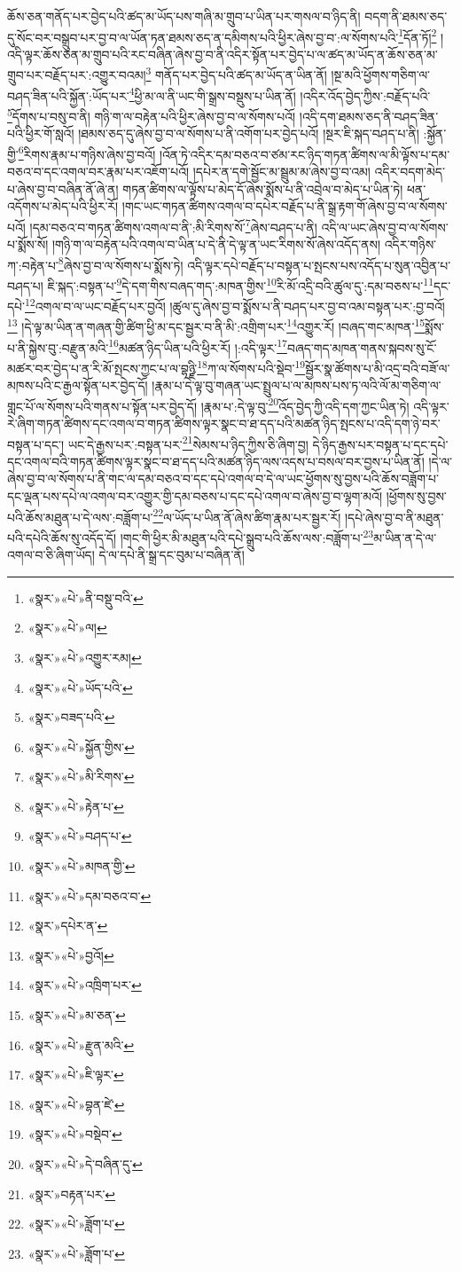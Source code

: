 ཆོས་ཅན་གནོད་པར་བྱེད་པའི་ཚད་མ་ཡོད་པས་གཞི་མ་གྲུབ་པ་ཡིན་པར་གསལ་བ་ཉིད་ནི། བདག་ནི་ཐམས་ཅད་དུ་སོང་བར་བསྒྲུབ་པར་བྱ་བ་ལ་ཡོན་ཏན་ཐམས་ཅད་ན་དམིགས་པའི་ཕྱིར་ཞེས་བྱ་བ་:ལ་སོགས་པའི་\footnote{«སྣར་»«པེ་»ནི་བསྡུ་བའི་}དོན་ཏོ།\footnote{«སྣར་»«པེ་»ལ།} །འདི་ལྟར་ཆོས་ཅན་མ་གྲུབ་པའི་རང་བཞིན་ཞེས་བྱ་བ་ནི་འདིར་སྟོན་པར་བྱེད་པ་ལ་ཚད་མ་ཡོད་ན་ཆོས་ཅན་མ་གྲུབ་པར་བརྗོད་པར་:འགྱུར་བའམ།\footnote{«སྣར་»«པེ་»འགྱུར་རམ།} གནོད་པར་བྱེད་པའི་ཚད་མ་ཡོད་ན་ཡིན་ནོ། །སྔ་མའི་ཕྱོགས་གཅིག་ལ་བཤད་ཟིན་པའི་སྐྱོན་:ཡོད་པར་\footnote{«སྣར་»«པེ་»ཡོད་པའི་}ཕྱི་མ་ལ་ནི་ཡང་གི་སྒྲས་བསྡུས་པ་ཡིན་ནོ། །འདིར་འོད་བྱེད་ཀྱིས་:བརྗོད་པའི་\footnote{«སྣར་»བཟད་པའི་}དོགས་པ་བསུ་བ་ནི། གཉི་ག་ལ་བརྟེན་པའི་ཕྱིར་ཞེས་བྱ་བ་ལ་སོགས་པའོ། །འདི་དག་ཐམས་ཅད་ནི་བཤད་ཟིན་པའི་ཕྱིར་གོ་སླའོ། །ཐམས་ཅད་དུ་ཞེས་བྱ་བ་ལ་སོགས་པ་ནི་འགོག་པར་བྱེད་པའོ། །སྔར་ཇི་སྐད་བཤད་པ་ནི། :སྐྱོན་གྱི་\footnote{«སྣར་»«པེ་»སྐྱོན་གྱིས་}རིགས་རྣམ་པ་གཉིས་ཞེས་བྱ་བའོ། །འོན་ཏེ་འདིར་དམ་བཅའ་བ་ཙམ་རང་ཉིད་གཏན་ཚིགས་ལ་མི་ལྟོས་པ་དམ་བཅའ་བ་དང་འགལ་བར་རྣམ་པར་འཇོག་པའོ། །དཔེར་ན་དགེ་སྦྱོང་མ་སྦྲུམ་མ་ཞེས་བྱ་བ་འམ། འདིར་བདག་མེད་པ་ཞེས་བྱ་བ་བཞིན་ནོ་ཞེ་ན། གཏན་ཚིགས་ལ་ལྟོས་པ་མེད་དོ་ཞེས་སྨོས་པ་ནི་འབྲེལ་བ་མེད་པ་ཡིན་ཏེ། ཕན་འདོགས་པ་མེད་པའི་ཕྱིར་རོ། །གང་ཡང་གཏན་ཚིགས་འགལ་བ་དཔེར་བརྗོད་པ་ནི་སྒྲ་རྟག་གོ་ཞེས་བྱ་བ་ལ་སོགས་པའོ། །དམ་བཅའ་བ་གཏན་ཚིགས་འགལ་བ་ནི་:མི་རིགས་སོ་\footnote{«སྣར་»«པེ་»མི་རིགས་}ཞེས་བཤད་པ་ནི། འདི་ལ་ཡང་ཞེས་བྱ་བ་ལ་སོགས་པ་སྨོས་སོ། །གཉི་ག་ལ་བརྟེན་པའི་འགལ་བ་ཡིན་པ་དེ་ནི་དེ་ལྟ་ན་ཡང་རིགས་སོ་ཞེས་འདོད་ནས། འདིར་གཉིས་ཀ་:བརྟེན་པ་\footnote{«སྣར་»«པེ་»རྟེན་པ་}ཞེས་བྱ་བ་ལ་སོགས་པ་སྨོས་ཏེ། འདི་ལྟར་དཔེ་བརྗོད་པ་བསྟན་པ་སྤངས་པས་འདོད་པ་སུན་འབྱིན་པ་བཤད་པ། ཇི་སྐད་:བསྟན་པ་\footnote{«སྣར་»«པེ་»བཤད་པ་}དེ་དག་གིས་བཞད་གད་:མཁན་གྱིས་\footnote{«སྣར་»«པེ་»མཁན་གྱི་}རི་མོ་འདྲི་བའི་ཚུལ་དུ་:དམ་བཅས་པ་\footnote{«སྣར་»«པེ་»དམ་བཅའ་བ་}དང་དཔེ་\footnote{«སྣར་»དཔེར་ན་}འགལ་བ་ལ་ཡང་བརྗོད་པར་བྱའོ། །ཚུལ་དུ་ཞེས་བྱ་བ་སྨོས་པ་ནི་བཤད་པར་བྱ་བ་འམ་བསྟན་པར་:བྱ་བའོ།\footnote{«སྣར་»«པེ་»བྱའོ།} །དེ་ལྟ་མ་ཡིན་ན་གཞན་གྱི་ཚིག་ཕྱི་མ་དང་སྦྱར་བ་ནི་མི་:འགྲིག་པར་\footnote{«སྣར་»«པེ་»འཁྲིག་པར་}འགྱུར་རོ། །བཞད་གང་མཁན་\footnote{«སྣར་»«པེ་»མ་ཅན་}སྨོས་པ་ནི་སྐྱེས་བུ་:བརྫུན་མའི་\footnote{«སྣར་»«པེ་»རྫུན་མའི་}མཚན་ཉིད་ཡིན་པའི་ཕྱིར་རོ། །:འདི་ལྟར་\footnote{«སྣར་»«པེ་»ཇི་ལྟར་}བཞད་གད་མཁན་གནས་སྐབས་སུ་ངོ་མཚར་བར་བྱེད་པ་ན་རི་མོ་སྤངས་ཀྱང་པ་ལ་བྷཉྫི་\footnote{«སྣར་»«པེ་»བྷན་ཛེ་}ཀ་ལ་སོགས་པའི་སྡེབ་\footnote{«སྣར་»«པེ་»བསྡེབ་}སྦྱོར་སྣ་ཚོགས་པ་མི་འདྲ་བའི་བཟོ་ལ་མཁས་པའི་ང་རྒྱལ་སྟོན་པར་བྱེད་དོ། །རྣམ་པ་དེ་ལྟ་བུ་གཞན་ཡང་སྤྲུལ་པ་ལ་མཁས་པས་ཏ་ལའི་ལོ་མ་གཅིག་ལ་གླང་པོ་ལ་སོགས་པའི་གནས་པ་སྟོན་པར་བྱེད་དོ། །རྣམ་པ་:དེ་ལྟ་བུ་\footnote{«སྣར་»«པེ་»དེ་བཞིན་དུ་}འོད་བྱེད་ཀྱི་འདི་དག་ཀྱང་ཡིན་ཏེ། འདི་ལྟར་རེ་ཞིག་གཏན་ཚིགས་དང་འགལ་བ་གཏན་ཚིགས་ལྟར་སྣང་བ་ཐ་དད་པའི་མཚན་ཉིད་སྤངས་པ་འདི་དག་ཉེ་བར་བསྟན་པ་དང་། ཡང་དེ་རྒྱས་པར་:བསྟན་པར་\footnote{«སྣར་»བརྟན་པར་}སེམས་པ་ཉིད་ཀྱིས་ཅི་ཞིག་བྱ། དེ་ཉིད་རྒྱས་པར་བསྟན་པ་དང་དཔེ་དང་འགལ་བའི་གཏན་ཚིགས་ལྟར་སྣང་བ་ཐ་དད་པའི་མཚན་ཉིད་ལས་འདས་པ་བསལ་བར་བྱས་པ་ཡིན་ནོ། །དེ་ལ་ཞེས་བྱ་བ་ལ་སོགས་པ་ནི་གང་ལ་དམ་བཅའ་བ་དང་དཔེ་འགལ་བ་དེ་ལ་ཡང་ཕྱོགས་སུ་བྱས་པའི་ཆོས་བཟློག་པ་དང་ལྡན་པས་དཔེ་ལ་འགལ་བར་འགྱུར་གྱི་དམ་བཅས་པ་དང་དཔེ་འགལ་བ་ཞེས་བྱ་བ་ལྷག་མའོ། །ཕྱོགས་སུ་བྱས་པའི་ཆོས་མཐུན་པ་དེ་ལས་:བཟློག་པ་\footnote{«སྣར་»«པེ་»ཟློག་པ་}ལ་ཡོད་པ་ཡིན་ནོ་ཞེས་ཚིག་རྣམ་པར་སྦྱར་རོ། །དཔེ་ཞེས་བྱ་བ་ནི་མཐུན་པའི་དཔེའི་ཆོས་སུ་འདོད་དོ། །གང་གི་ཕྱིར་མི་མཐུན་པའི་དཔེ་སྒྲུབ་པའི་ཆོས་ལས་:བཟློག་པ་\footnote{«སྣར་»«པེ་»ཟློག་པ་}མ་ཡིན་ན་དེ་ལ་འགལ་བ་ཅི་ཞིག་ཡོད། དེ་ལ་དཔེ་ནི་སྒྲ་དང་བུམ་པ་བཞིན་ནོ། 